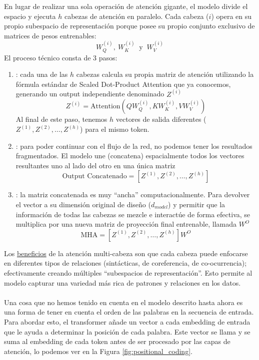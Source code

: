 \noindent
En lugar de realizar una sola operación de atención gigante, el modelo divide el espacio y ejecuta $h$ cabezas de atención en paralelo. Cada cabeza ($i$) opera en su propio subespacio de representación porque posee su propio conjunto exclusivo de matrices de pesos entrenables: 
$$W_Q^{(i)}, \ W_K^{(i)} \ \text{  y } \ W_V^{(i)}$$
El proceso técnico consta de 3 pasos:
\begin{enumerate}
    \item {}: cada una de las $h$ cabezas calcula su propia matriz de atención utilizando la fórmula estándar de Scaled Dot-Product Attention que ya conocemos, generando un output independiente denominado $Z^{(i)}$
    $$Z^{(i)} = \text{Attention}(QW_Q^{(i)}, KW_K^{(i)}, VW_V^{(i)})$$
    Al final de este paso, tenemos $h$ vectores de salida diferentes ($Z^{(1)}, Z^{(2)}, \dots, Z^{(h)}$) para el mismo token.
    \item {}: para poder continuar con el flujo de la red, no podemos tener los resultados fragmentados. El modelo une (concatena) espacialmente todos los vectores resultantes uno al lado del otro en una única matriz
    $$\text{Output Concatenado} = [Z^{(1)}, Z^{(2)}, \dots, Z^{(h)}]$$
    \item {}: la matriz concatenada es muy ``ancha'' computacionalmente. Para devolver el vector a su dimensión original de diseño ($d_{model}$) y permitir que la información de todas las cabezas se mezcle e interactúe de forma efectiva, se multiplica por una nueva matriz de proyección final entrenable, llamada $W^O$
    $$\text{MHA} = [Z^{(1)}, Z^{(2)}, \dots, Z^{(h)}]W^O$$
\end{enumerate}
Los \underline{beneficios} de la atención multi-cabeza son que cada cabeza puede enfocarse en diferentes tipos de relaciones (sintácticas, de coreferencia, de co-ocurrencia); efectivamente creando múltiples ``subespacios de representación''. Esto permite al modelo capturar una variedad más rica de patrones y relaciones en los datos. \\ \\

\noindent
Una cosa que no hemos tenido en cuenta en el modelo descrito hasta ahora es una forma de tener en cuenta el orden de las palabras en la secuencia de entrada. Para abordar esto, el transformer añade un vector a cada embedding de entrada que le ayuda a determinar la posición de cada palabra. Este vector se llama  y se suma al embedding de cada token antes de ser procesado por las capas de atención, lo podemos ver en la Figura \ref{fig:positional_coding}. 

